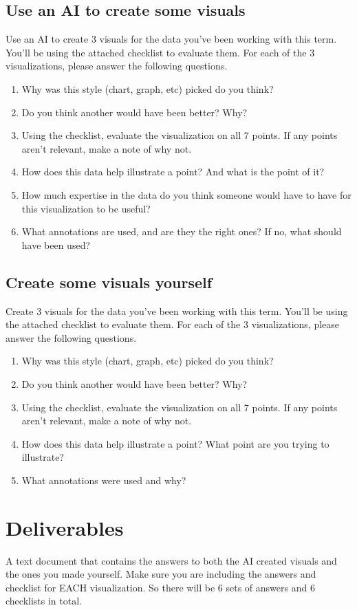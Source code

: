 \documentclass[12pt]{article}
\begin{document}
\subsection*{Use an AI to create some visuals}
Use an AI to create 3 visuals for the data you've been working with this term.  You'll be using the attached checklist to evaluate them.  For each of the 3 visualizations, please answer the following questions.
    \begin{enumerate}
        \item Why was this style (chart, graph, etc) picked do you think? 
        \item Do you think another would have been better? Why? 
        \item Using the checklist, evaluate the visualization on all 7 points.  If any points aren't relevant, make a note of why not.
        \item How does this data help illustrate a point? And what is the point of it?
        \item How much expertise in the data do you think someone would have to have for this visualization to be useful?
        \item What annotations are used, and are they the right ones? If no, what should have been used?
    \end{enumerate}

\subsection*{Create some visuals yourself}
Create 3 visuals for the data you've been working with this term.  You'll be using the attached checklist to evaluate them.  For each of the 3 visualizations, please answer the following questions.
    \begin{enumerate}
        \item Why was this style (chart, graph, etc) picked do you think? 
        \item Do you think another would have been better? Why? 
        \item Using the checklist, evaluate the visualization on all 7 points. If any points aren't relevant, make a note of why not.
        \item How does this data help illustrate a point? What point are you trying to illustrate?
        \item What annotations were used and why?
    \end{enumerate}



\section*{Deliverables}
A text document that contains the answers to both the AI created visuals and the ones you made yourself.  Make sure you are including the answers and checklist for EACH visualization. So there will be 6 sets of answers and 6 checklists in total. 
\end{document}
